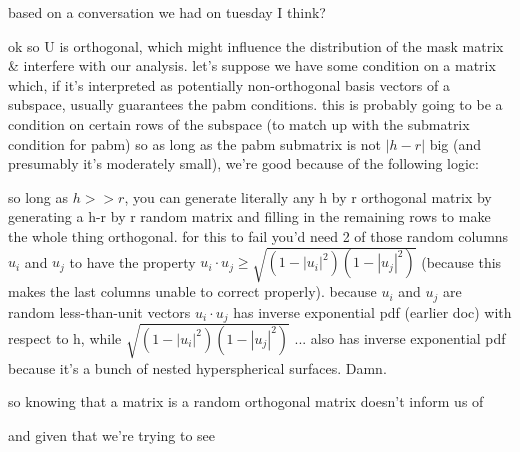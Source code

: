 \documentclass[12pt]{article}
\begin{document}
based on a conversation we had on tuesday I think?

ok so U is orthogonal, which might influence the distribution of the mask matrix \& interfere with our analysis.
let's suppose we have some condition on a matrix which, if it's interpreted as potentially non-orthogonal basis vectors of a subspace, usually guarantees the pabm conditions.
this is probably going to be a condition on certain rows of the subspace (to match up with the submatrix condition for pabm)
so as long as the pabm submatrix is not $|h - r|$ big (and presumably it's moderately small), we're good because of the following logic:

so long as $h >> r$, you can generate literally any h by r orthogonal matrix by generating a h-r by r random matrix and filling in the remaining rows to make the whole thing orthogonal. for this to fail you'd need 2 of those random columns $u_i$ and $u_j$ to have the property $u_i \cdot u_j \geq \sqrt{(1 - |u_i|^2)(1 - |u_j|^2)}$ (because this makes the last columns unable to correct properly). because $u_i$ and $u_j$ are random less-than-unit vectors $u_i \cdot u_j$ has inverse exponential pdf (earlier doc) with respect to h, while $\sqrt{(1 - |u_i|^2)(1 - |u_j|^2)}$ ... also has inverse exponential pdf because it's a bunch of nested hyperspherical surfaces. Damn.

so knowing that a matrix is a random orthogonal matrix doesn't inform us of 

and given that we're trying to see
\end{document}
